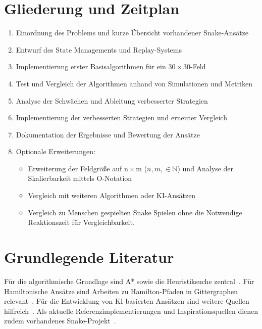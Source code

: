 \documentclass[a4paper]{scrartcl}
\newcommand{\boardsize}{30\,$\times$\,30}
\begin{document}
\section{Gliederung und Zeitplan}
\begin{enumerate}
\item Einordnung des Problems und kurze Übersicht vorhandener Snake-Ansätze
\item Entwurf des State Managements und Replay-Systems
\item Implementierung erster Basisalgorithmen für ein \boardsize-Feld
\item Test und Vergleich der Algorithmen anhand von Simulationen und Metriken
\item Analyse der Schwächen und Ableitung verbesserter Strategien
\item Implementierung der verbesserten Strategien und erneuter Vergleich
\item Dokumentation der Ergebnisse und Bewertung der Ansätze
\item Optionale Erweiterungen:
    \begin{itemize}
        \item Erweiterung der Feldgröße auf n\,$\times$\,m ($n, m, \in \mathbb{N}$) und Analyse der Skalierbarkeit mittels O-Notation
        \item Vergleich mit weiteren Algorithmen oder KI-Ansätzen
        \item Vergleich zu Menschen gespielten Snake Spielen ohne die Notwendige Reaktionszeit für Vergleichbarkeit.
    \end{itemize}
\end{enumerate}

\section{Grundlegende Literatur}
Für die algorithmische Grundlage sind A* sowie die Heuristiksuche zentral~\cite{Hart1968,Edelkamp2011}. Für Hamiltonische Ansätze sind Arbeiten zu Hamilton-Pfaden in Gittergraphen relevant~\cite{Itai1982,Chvatal1985}. Für die Entwicklung von KI basierten Ansätzen sind weitere Quellen hilfreich~\cite{Justesen2019,Togelius2009}. Als aktuelle Referenzimplementierungen und Inspirationsquellen dienen zudem vorhandenes Snake-Projekt~\cite{alphaPhoenix}.
\end{document}
